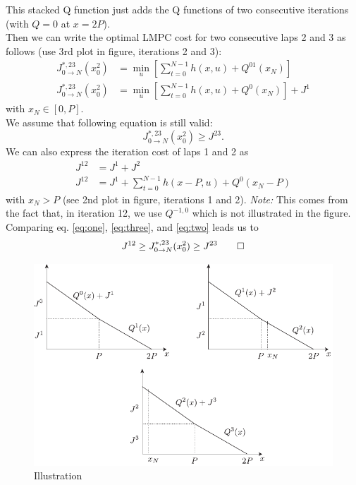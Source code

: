 \documentclass[10pt,a4paper]{article}
\begin{document}
This stacked Q function just adds the Q functions of two consecutive iterations (with $Q=0$ at $x=2P$).\\
Then we can write the optimal LMPC cost for two consecutive laps 2 and 3 as follows (use 3rd plot in figure, iterations 2 and 3):
\begin{align}
J_{0\rightarrow N}^{*,23}(x_0^2)&=\min_u\left[\sum_{t=0}^{N-1}h(x,u)+Q^{01}(x_N)\right]\\
J_{0\rightarrow N}^{*,23}(x_0^2)&=\min_u\left[\sum_{t=0}^{N-1}h(x,u)+Q^0(x_N)\right]+J^1\label{eq:one}
\end{align}
with $x_N\in [0,P]$.\\
We assume that following equation is still valid:
\begin{equation}
J_{0\rightarrow N}^{*,23}(x_0^2)\geq J^{23}.\label{eq:three}
\end{equation}
We can also express the iteration cost of laps 1 and 2 as
\begin{align}
J^{12}&=J^1+J^2\\
J^{12}&=J^1+\sum_{t=0}^{N-1}h(x-P,u)+Q^0(x_N-P) \label{eq:two}
\end{align}
with $x_N>P$ (see 2nd plot in figure, iterations 1 and 2). \emph{Note:} This comes from the fact that, in iteration 12, we use $Q^{-1,0}$ which is not illustrated in the figure.\\
Comparing eq. \ref{eq:one}, \ref{eq:three}, and \ref{eq:two} leads us to
\begin{equation}
J^{12}\geq J_{0\rightarrow N}^{*,23}(x_0^2) \geq J^{23}\qed
\end{equation}

\begin{figure}[ht]
	\centering
  \includegraphics{graph.pdf}
	\caption{Illustration}
	\label{fig:proof}
\end{figure}
\end{document}
